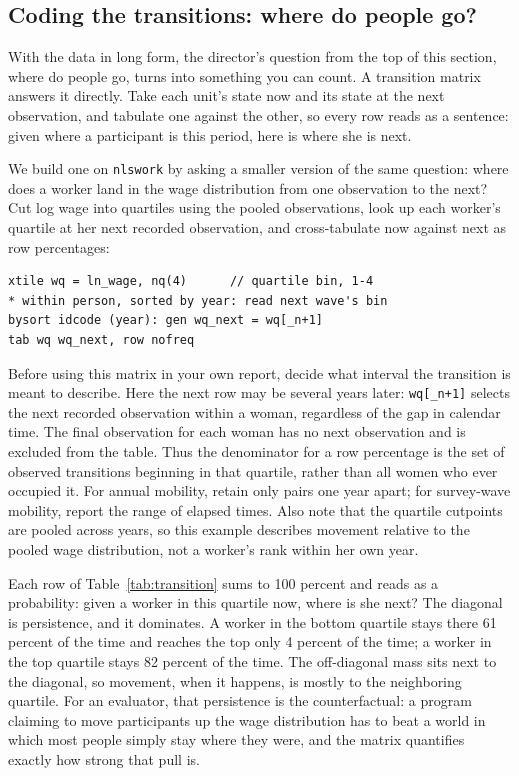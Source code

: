 \subsection{Coding the transitions: where do people go?}\label{sec:ch06-transitions}
With the data in long form, the director's question from the top of this section, where do people go, turns into something you can count. A transition matrix answers it directly. Take each unit's state now and its state at the next observation, and tabulate one against the other, so every row reads as a sentence: given where a participant is this period, here is where she is next.

We build one on \texttt{nlswork} by asking a smaller version of the same question: where does a worker land in the wage distribution from one observation to the next? Cut log wage into quartiles using the pooled observations, look up each worker's quartile at her next recorded observation, and cross-tabulate now against next as row percentages:
\par
{\footnotesize
\begin{verbatim}
xtile wq = ln_wage, nq(4)      // quartile bin, 1-4
* within person, sorted by year: read next wave's bin
bysort idcode (year): gen wq_next = wq[_n+1]
tab wq wq_next, row nofreq
\end{verbatim}
}

Before using this matrix in your own report, decide what interval the transition is meant to describe. Here the next row may be several years later: \texttt{wq[\_n+1]} selects the next recorded observation within a woman, regardless of the gap in calendar time. The final observation for each woman has no next observation and is excluded from the table. Thus the denominator for a row percentage is the set of observed transitions beginning in that quartile, rather than all women who ever occupied it. For annual mobility, retain only pairs one year apart; for survey-wave mobility, report the range of elapsed times. Also note that the quartile cutpoints are pooled across years, so this example describes movement relative to the pooled wage distribution, not a worker's rank within her own year.

Each row of Table~\ref{tab:transition} sums to 100 percent and reads as a probability: given a worker in this quartile now, where is she next? The diagonal is persistence, and it dominates. A worker in the bottom quartile stays there 61 percent of the time and reaches the top only 4 percent of the time; a worker in the top quartile stays 82 percent of the time. The off-diagonal mass sits next to the diagonal, so movement, when it happens, is mostly to the neighboring quartile. For an evaluator, that persistence is the counterfactual: a program claiming to move participants up the wage distribution has to beat a world in which most people simply stay where they were, and the matrix quantifies exactly how strong that pull is.

